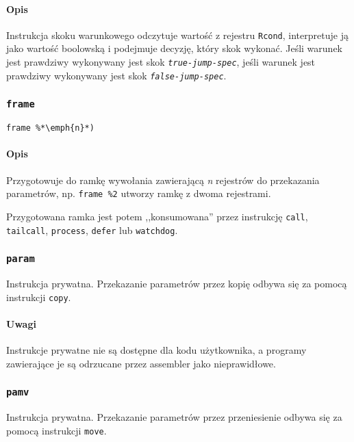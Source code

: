 \paragraph*{Opis} Instrukcja skoku warunkowego odczytuje wartość z rejestru
\texttt{Rcond}, interpretuje ją jako wartość boolowską i podejmuje decyzję,
który skok wykonać. Jeśli warunek jest prawdziwy wykonywany jest skok
\texttt{\emph{true-jump-spec}}, jeśli warunek jest prawdziwy wykonywany jest
skok \texttt{\emph{false-jump-spec}}.

\subsubsection{\texttt{frame}}

\begin{lstlisting}
frame %*\emph{n}*)
\end{lstlisting}

\paragraph*{Opis} Przygotowuje do ramkę wywołania zawierającą \emph{n} rejestrów
do przekazania parametrów, np. \texttt{frame \%2} utworzy ramkę z dwoma
rejestrami.

Przygotowana ramka jest potem ,,konsumowana'' przez instrukcję \texttt{call},
\texttt{tailcall}, \texttt{process}, \texttt{defer} lub \texttt{watchdog}.

\subsubsection{\texttt{param}}

Instrukcja prywatna.
Przekazanie parametrów przez kopię odbywa się za pomocą instrukcji
\texttt{copy}.

\paragraph*{Uwagi}

Instrukcje prywatne nie są dostępne dla kodu użytkownika, a programy zawierające
je są odrzucane przez assembler jako nieprawidłowe.

\subsubsection{\texttt{pamv}}

Instrukcja prywatna.
Przekazanie parametrów przez przeniesienie odbywa się za pomocą instrukcji
\texttt{move}.

